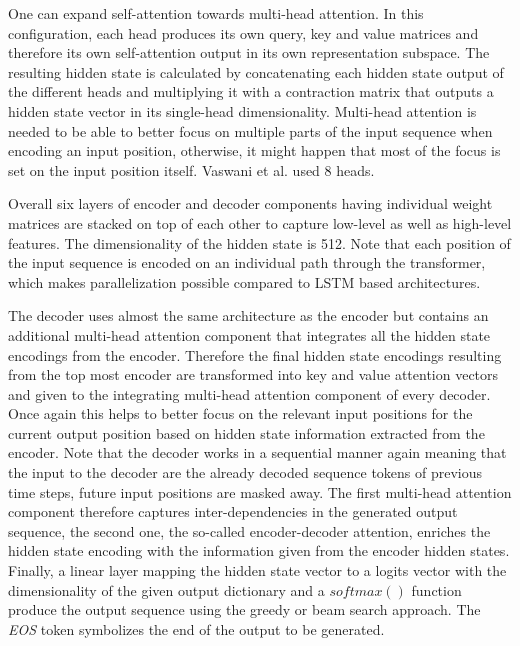 One can expand self-attention towards multi-head attention. In this configuration, each head produces its own query, key and value matrices and therefore its own self-attention output in its own representation subspace. The resulting hidden state is calculated by concatenating each hidden state output of the different heads and multiplying it with a contraction matrix that outputs a hidden state vector in its single-head dimensionality. Multi-head attention is needed to be able to better focus on multiple parts of the input sequence when encoding an input position, otherwise, it might happen that most of the focus is set on the input position itself. Vaswani et al. \cite{Vaswani2017} used 8 heads. \cite{Alammar2018, Vaswani2017}

Overall six layers of encoder and decoder components having individual weight matrices are stacked on top of each other to capture low-level as well as high-level features. The dimensionality of the hidden state is 512. Note that each position of the input sequence is encoded on an individual path through the transformer, which makes parallelization possible compared to \ac{LSTM} based architectures. \cite{Alammar2018, Vaswani2017}

The decoder uses almost the same architecture as the encoder but contains an additional multi-head attention component that integrates all the hidden state encodings from the encoder. Therefore the final hidden state encodings resulting from the top most encoder are transformed into key and value attention vectors and given to the integrating multi-head attention component of every decoder. Once again this helps to better focus on the relevant input positions for the current output position based on hidden state information extracted from the encoder. Note that the decoder works in a sequential manner again meaning that the input to the decoder are the already decoded sequence tokens of previous time steps, future input positions are masked away. The first multi-head attention component therefore captures inter-dependencies in the generated output sequence, the second one, the so-called encoder-decoder attention, enriches the hidden state encoding with the in\-for\-ma\-ti\-on given from the encoder hidden states. Finally, a linear layer mapping the hidden state vector to a logits vector with the dimensionality of the given output dictionary and a $softmax()$ function produce the output sequence using the greedy or beam search approach. The \textit{EOS} token symbolizes the end of the output to be generated. \cite{Alammar2018, Vaswani2017}

